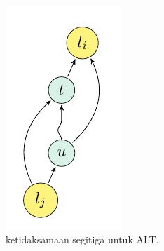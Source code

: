 \begin{figure}[H]
    \centering
    \includegraphics[]{figures/ALT.png}
    \caption{ketidaksamaan segitiga untuk ALT.}
    \label{fig:alt-triangle-ineq}
\end{figure}

